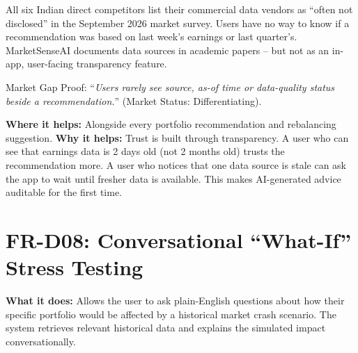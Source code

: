 \documentclass[12pt, a4paper, openany, oneside]{report}
\begin{document}
\begin{gapbox}
All six Indian direct competitors list their commercial data vendors as ``often not disclosed'' in the September 2026 market survey. Users have no way to know if a recommendation was based on last week's earnings or last quarter's. MarketSenseAI documents data sources in academic papers -- but not as an in-app, user-facing transparency feature.

Market Gap Proof: ``\textit{Users rarely see source, as-of time or data-quality status beside a recommendation.}'' (Market Status: Differentiating).
\end{gapbox}

\begin{valuebox}
\textbf{Where it helps:} Alongside every portfolio recommendation and rebalancing suggestion. \textbf{Why it helps:} Trust is built through transparency. A user who can see that earnings data is 2 days old (not 2 months old) trusts the recommendation more. A user who notices that one data source is stale can ask the app to wait until fresher data is available. This makes AI-generated advice auditable for the first time.
\end{valuebox}

\section{FR-D08: Conversational ``What-If'' Stress Testing}

\textbf{What it does:} Allows the user to ask plain-English questions about how their specific portfolio would be affected by a historical market crash scenario. The system retrieves relevant historical data and explains the simulated impact conversationally.
\end{document}
